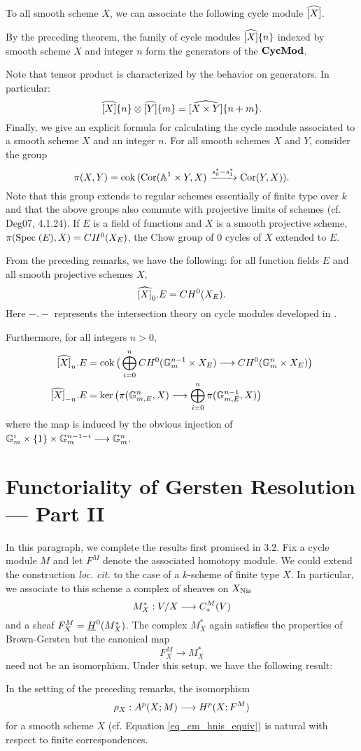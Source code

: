 To all smooth scheme $X$, we can associate the following cycle 
module $\widehat{[X]}$.

By the preceding theorem, the family of cycle modules 
$\widehat{[X]}\{n\}$ indexed by smooth scheme $X$ and integer 
$n$ form the generators of the $\mathbf{CycMod}$.

Note that tensor product is characterized by the behavior on 
generators. In particular:
\[
\widehat{[X]}\{n\} \otimes \widehat{[Y]}\{m\} =
\widehat{[X \times Y]}\{n + m\}.
\]
Finally, we give an explicit formula for calculating the cycle 
module associated to a smooth scheme $X$ and an integer $n$. 
For all smooth schemes $X$ and $Y$, consider the group
\[
\pi(X, Y) = \mathrm{cok}\, (\mathrm{Cor}(\mathbb{A}^1 \times Y, X) 
   \xrightarrow{s_0^* - s_1^*} \mathrm{Cor}(Y, X)).
\]
Note that this group extends to regular schemes essentially of 
finite type over $k$ and that the above groups also commute with
projective limits of schemes (cf. Deg07, 4.1.24). If $E$ is a 
field of functions and $X$ is a smooth projective scheme, 
$\pi(\mathrm{Spec}\;(E), X) = CH^0(X_E)$, the Chow group of 0 cycles of
$X$ extended to $E$.

From the preceding remarks, we have the following: for all 
function fields $E$ and all smooth projective schemes $X$,
\[
\widehat{[X]}_0 . E = CH^0(X_E).
\]
Here $- . -$ represents the intersection theory on cycle modules 
developed in \cite{Ro96}.

Furthermore, for all integers $n > 0$,
\begin{align*}
\widehat{[X]}_n . E &= \mathrm{cok}\,\big( \bigoplus_{i = 0}^n 
   CH^0(\mathbb{G}_m^{n - 1} \times X_E) \longrightarrow 
      CH^0(\mathbb{G}_m^n \times X_E)\big) \\
\widehat{[X]}_{-n} . E &= \mathrm{ker}\,\big(\pi(\mathbb{G}_{m,E}^n, X)
   \longrightarrow \bigoplus_{i = 0}^n \pi(\mathbb{G}_{m, E}^{n - 1}, X)\big)
\end{align*}
where the map is induced by the obvious injection of $\mathbb{G}_m^i 
\times \{1\} \times \mathbb{G}_m^{n - 1 - i} \longrightarrow \mathbb{G}_m^n$.

\section{Functoriality of Gersten Resolution --- Part II}

In this paragraph, we complete the results first promised in 3.2.
Fix a cycle module $M$ and let $F^M$ denote the associated 
homotopy module. We could extend the construction \emph{loc. cit.}
to the case of a $k$-scheme of finite type $X$. In particular, we 
associate to this scheme a complex of sheaves on $X_{\mathrm{Nis}}$
\[
M^*_X: V/X \longrightarrow C_*^{M}(V)
\]
and a sheaf $F^M_X = \underline{H}^0(M^*_X)$. The complex $M^*_X$ 
again satisfies the properties of Brown-Gersten but the canonical
map
\[
F^M_X \to M^*_X
\]
need not be an isomorphism. Under this setup, we have the 
following result:
\begin{prop}\label{prop_3_10}
In the setting of the preceding remarks, the isomorphism
\[
\rho_X: A^p(X; M) \longrightarrow H^p(X; F^M)
\]
for a smooth scheme $X$ (cf. Equation \ref{eq_cm_hnis_equiv}) is 
natural with respect to finite correspondences.
\end{prop}
